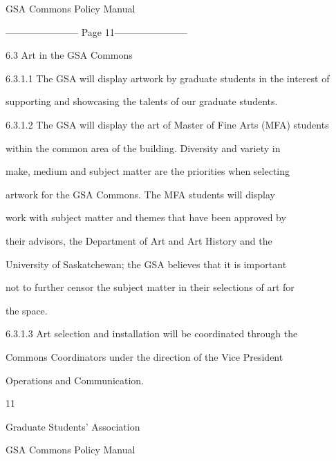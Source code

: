                                     GSA Commons Policy Manual  

  


----------------------- Page 11-----------------------

                         6.3      Art in the GSA Commons   

  

6.3.1.1   The GSA will display artwork by graduate students in the interest of  

            supporting and showcasing the talents of our graduate students.   

  

6.3.1.2   The GSA will display the art of Master of Fine Arts (MFA) students  

            within  the  common  area  of  the  building.  Diversity  and  variety  in  

            make, medium and subject matter are the priorities when selecting  

            artwork  for  the  GSA  Commons.  The  MFA  students  will  display  

            work  with  subject  matter  and  themes  that  have  been  approved  by  

            their  advisors,  the  Department  of  Art  and  Art  History  and  the  

            University of Saskatchewan; the GSA believes that it is important  

            not to further censor the subject matter in their selections of art for  

            the space.   

  

6.3.1.3  Art   selection   and   installation   will   be  coordinated   through   the  

            Commons  Coordinators  under  the  direction  of  the  Vice  President  

            Operations and Communication.   



                                                      11  

                                     

                                   Graduate Students’ Association  

                                   GSA Commons Policy Manual  

  


